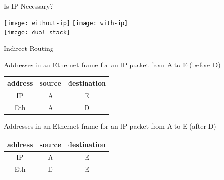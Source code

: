 \begin{frame}{Is IP Necessary?}
  \begin{center}
    \texttt{[image: without-ip]}\qquad
    \texttt{[image: with-ip]}\\[1em]
    \texttt{[image: dual-stack]}
  \end{center}
\end{frame}

\begin{frame}{Indirect Routing}
  \begin{center}
  \end{center}
  \label{fig:indirect-routing}
\end{frame}

\begin{frame}
  \begin{iblock}{Addresses in an Ethernet frame for an IP packet from A to E (before D)}
    \begin{center}
      \begin{tabular}{ccc}
        \toprule
        address & source & destination\\\midrule
        IP & A & E \\
        Eth & A & D \\\bottomrule
      \end{tabular}
    \end{center}
  \end{iblock}
  \begin{iblock}{Addresses in an Ethernet frame for an IP packet from A to E (after D)}
    \begin{center}
      \begin{tabular}{ccc}
        \toprule
        address & source & destination\\\midrule
        IP & A & E \\
        Eth & D & E \\\bottomrule
      \end{tabular}
    \end{center}
  \end{iblock}
\end{frame}

